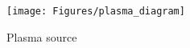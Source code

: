 \documentclass[11pt, oneside]{article}   	%
\newcommand{\todo}[1]{ \textcolor{red}{\bf{To Do:} #1}}
\begin{document}

\begin{figure}
\centering
\texttt{[image: Figures/plasma\_diagram]}
\caption{Plasma source}
\label{fig:plasma_diagram}
\end{figure}
\end{document}
